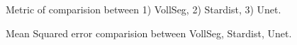 \documentclass[letterpaper,compsoc,twoside]{IEEEtran}
\begin{document}
\begin{figure}[]
\caption{Metric of comparision between 1) VollSeg, 2) Stardist, 3) Unet.}
\end{figure}\begin{figure}[]
\label{fig-mse}\noindent{}
\caption{Mean Squared error comparision between VollSeg,  Stardist, Unet.}
\end{figure}\begin{figure}[]
\label{fig-gtvoll}\noindent{}

\end{figure}
\end{document}
